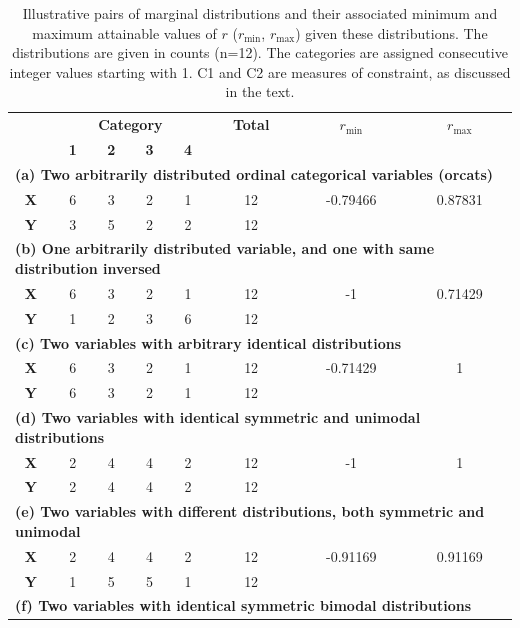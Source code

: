 \documentclass[
  12pt,
]{article}
\theoremstyle{plain}
\theoremstyle{definition}
\theoremstyle{remark}
\begin{document}
\begin{table}[H]
\centering
\caption{Illustrative pairs of marginal distributions and their associated minimum and maximum attainable values of $r$ ($r_{\min}$, $r_{\max}$) given these distributions. The distributions are given in counts (n=12). The categories are assigned consecutive integer values starting with 1. C1 and C2 are measures of constraint, as discussed in the text.}
\label{tab:marginal_distributions}

\vspace{0.5em}

\begin{tabular}{c|cccc|c|cc}
\hline
 & \multicolumn{4}{c|}{\textbf{Category}} & \textbf{Total} & $r_{\min}$ & $r_{\max}$ \\
 & \textbf{1} & \textbf{2} & \textbf{3} & \textbf{4} & & & \\
\hline
\multicolumn{8}{l}{\textbf{(a) Two arbitrarily distributed ordinal categorical variables (orcats)}} \\
\textbf{X} & 6 & 3 & 2 & 1 & 12 & -0.79466 & 0.87831 \\
\textbf{Y} & 3 & 5 & 2 & 2 & 12 & & \\
\hline
\multicolumn{8}{l}{\textbf{(b) One arbitrarily distributed variable, and one with same distribution inversed}} \\
\textbf{X} & 6 & 3 & 2 & 1 & 12 & -1 & 0.71429 \\
\textbf{Y} & 1 & 2 & 3 & 6 & 12 & & \\
\hline
\multicolumn{8}{l}{\textbf{(c) Two variables with arbitrary identical distributions}} \\
\textbf{X} & 6 & 3 & 2 & 1 & 12 & -0.71429 & 1 \\
\textbf{Y} & 6 & 3 & 2 & 1 & 12 & & \\
\hline
\multicolumn{8}{l}{\textbf{(d) Two variables with identical symmetric and unimodal distributions}} \\
\textbf{X} & 2 & 4 & 4 & 2 & 12 & -1 & 1 \\
\textbf{Y} & 2 & 4 & 4 & 2 & 12 & & \\
\hline
\multicolumn{8}{l}{\textbf{(e) Two variables with different distributions, both symmetric and unimodal}} \\
\textbf{X} & 2 & 4 & 4 & 2 & 12 & -0.91169 & 0.91169 \\
\textbf{Y} & 1 & 5 & 5 & 1 & 12 & & \\
\hline
\multicolumn{8}{l}{\textbf{(f) Two variables with identical symmetric bimodal distributions}} \\

\end{tabular}
\end{table}
\end{document}
